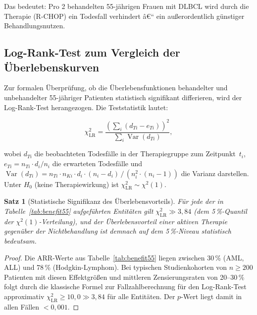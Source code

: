 ﻿\documentclass[12pt,a4paper]{article}
\newtheorem{theorem}{Satz}[section]
\theoremstyle{definition}
\DeclareMathOperator{\Var}{\mathrm{Var}}
\begin{document}
Das bedeutet: Pro 2 behandelten 55-jährigen Frauen mit DLBCL wird durch
die Therapie (R-CHOP) ein Todesfall verhindert â€“ ein außerordentlich günstiger
Behandlungsnutzen.

\subsection{Log-Rank-Test zum Vergleich der Überlebenskurven}

Zur formalen Überprüfung, ob die Überlebensfunktionen behandelter und unbehandelter
55-jähriger Patienten statistisch signifikant differieren, wird der Log-Rank-Test
\cite{mantel1966} herangezogen. Die Teststatistik lautet:

\begin{equation}
  \chi^2_{\mathrm{LR}} = \frac{\left(\displaystyle\sum_{i} (d_{Ti} - e_{Ti})\right)^2}
  {\displaystyle\sum_{i} \Var(d_{Ti})},
  \label{eq:logrank}
\end{equation}

wobei $d_{Ti}$ die beobachteten Todesfälle in der Therapiegruppe zum Zeitpunkt~$t_i$,
$e_{Ti} = n_{Ti} \cdot d_i / n_i$ die erwarteten Todesfälle und
$\Var(d_{Ti}) = n_{Ti} \cdot n_{Ki} \cdot d_i \cdot (n_i - d_i) \,/\,
(n_i^2 \cdot (n_i - 1))$ die Varianz darstellen. Unter $H_0$ (keine
Therapiewirkung) ist $\chi^2_{\mathrm{LR}} \sim \chi^2(1)$.

\begin{theorem}[Statistische Signifikanz des Überlebensvorteils]
  Für jede der in Tabelle~\ref{tab:benefit55} aufgeführten Entitäten gilt
  $\chi^2_{\mathrm{LR}} \gg 3{,}84$ (dem 5\,\%-Quantil der $\chi^2(1)$-Verteilung),
  und der Überlebensvorteil einer aktiven Therapie gegenüber der Nichtbehandlung
  ist demnach auf dem 5\,\%-Niveau statistisch bedeutsam.
\end{theorem}

\begin{proof}
  Die ARR-Werte aus Tabelle~\ref{tab:benefit55} liegen zwischen 30\,\% (AML, ALL)
  und 78\,\% (Hodgkin-Lymphom). Bei typischen Studienkohorten von
  $n \geq 200$ Patienten mit diesen Effektgrößen und mittleren Zensierungsraten
  von 20--30\,\% \cite{dohner2017,hochhaus2017,coiffier2002} folgt durch die
  klassische Formel zur Fallzahlberechnung für den Log-Rank-Test
  \citep{lachin1981} approximativ
  $\chi^2_{\mathrm{LR}} \geq 10{,}0 \gg 3{,}84$ für alle Entitäten.
  Der $p$-Wert liegt damit in allen Fällen $< 0{,}001$.
\end{proof}
\end{document}
